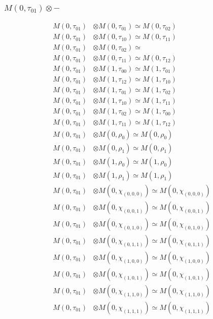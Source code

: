 \subsubsection{$ M(0,\tau_{01})\otimes -$}
\begin{align*}
M(0,\tau_{01}) &\otimes M(0,\tau_{01}) \simeq M(0,\tau_{02}) \\
M(0,\tau_{01}) &\otimes M(0,\tau_{10}) \simeq M(0,\tau_{11}) \\
M(0,\tau_{01}) &\otimes M(0,\tau_{02}) \simeq  \\
M(0,\tau_{01}) &\otimes M(0,\tau_{11}) \simeq M(0,\tau_{12}) \\
M(0,\tau_{01}) &\otimes M(1,\tau_{00}) \simeq M(1,\tau_{01}) \\
M(0,\tau_{01}) &\otimes M(1,\tau_{12}) \simeq M(1,\tau_{10}) \\
M(0,\tau_{01}) &\otimes M(1,\tau_{01}) \simeq M(1,\tau_{02}) \\
M(0,\tau_{01}) &\otimes M(1,\tau_{10}) \simeq M(1,\tau_{11}) \\
M(0,\tau_{01}) &\otimes M(1,\tau_{02}) \simeq M(1,\tau_{00}) \\
M(0,\tau_{01}) &\otimes M(1,\tau_{11}) \simeq M(1,\tau_{12}) \\
M(0,\tau_{01}) &\otimes M(0,\rho_{0}) \simeq M(0,\rho_{0}) \\
M(0,\tau_{01}) &\otimes M(0,\rho_{1}) \simeq M(0,\rho_{1}) \\
M(0,\tau_{01}) &\otimes M(1,\rho_{0}) \simeq M(1,\rho_{0}) \\
M(0,\tau_{01}) &\otimes M(1,\rho_{1}) \simeq M(1,\rho_{1}) \\
M(0,\tau_{01}) &\otimes M(0,\chi_{(0,0,0)}) \simeq M(0,\chi_{(0,0,0)}) \\
M(0,\tau_{01}) &\otimes M(0,\chi_{(0,0,1)}) \simeq M(0,\chi_{(0,0,1)}) \\
M(0,\tau_{01}) &\otimes M(0,\chi_{(0,1,0)}) \simeq M(0,\chi_{(0,1,0)}) \\
M(0,\tau_{01}) &\otimes M(0,\chi_{(0,1,1)}) \simeq M(0,\chi_{(0,1,1)}) \\
M(0,\tau_{01}) &\otimes M(0,\chi_{(1,0,0)}) \simeq M(0,\chi_{(1,0,0)}) \\
M(0,\tau_{01}) &\otimes M(0,\chi_{(1,0,1)}) \simeq M(0,\chi_{(1,0,1)}) \\
M(0,\tau_{01}) &\otimes M(0,\chi_{(1,1,0)}) \simeq M(0,\chi_{(1,1,0)}) \\
M(0,\tau_{01}) &\otimes M(0,\chi_{(1,1,1)}) \simeq M(0,\chi_{(1,1,1)}) \\

\end{align*}
